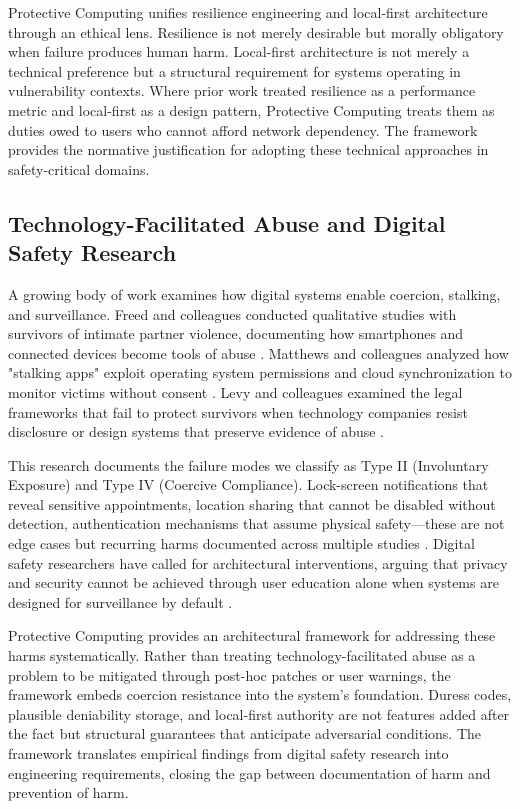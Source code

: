 \documentclass[acmsmall,review]{acmart}
\begin{document}
Protective Computing unifies resilience engineering and local-first architecture through an ethical lens. Resilience is not merely desirable but morally obligatory when failure produces human harm. Local-first architecture is not merely a technical preference but a structural requirement for systems operating in vulnerability contexts. Where prior work treated resilience as a performance metric and local-first as a design pattern, Protective Computing treats them as duties owed to users who cannot afford network dependency. The framework provides the normative justification for adopting these technical approaches in safety-critical domains.

\subsection{Technology-Facilitated Abuse and Digital Safety Research}

A growing body of work examines how digital systems enable coercion, stalking, and surveillance. Freed and colleagues conducted qualitative studies with survivors of intimate partner violence, documenting how smartphones and connected devices become tools of abuse \cite{Freed2018,Freed2019}. Matthews and colleagues analyzed how "stalking apps" exploit operating system permissions and cloud synchronization to monitor victims without consent \cite{Matthews2021}. Levy and colleagues examined the legal frameworks that fail to protect survivors when technology companies resist disclosure or design systems that preserve evidence of abuse \cite{Levy2020,Tsukayama2022}.

This research documents the failure modes we classify as Type II (Involuntary Exposure) and Type IV (Coercive Compliance). Lock-screen notifications that reveal sensitive appointments, location sharing that cannot be disabled without detection, authentication mechanisms that assume physical safety---these are not edge cases but recurring harms documented across multiple studies \cite{Chatfield2023,Dell2023}. Digital safety researchers have called for architectural interventions, arguing that privacy and security cannot be achieved through user education alone when systems are designed for surveillance by default \cite{Stark2020}.

Protective Computing provides an architectural framework for addressing these harms systematically. Rather than treating technology-facilitated abuse as a problem to be mitigated through post-hoc patches or user warnings, the framework embeds coercion resistance into the system's foundation. Duress codes, plausible deniability storage, and local-first authority are not features added after the fact but structural guarantees that anticipate adversarial conditions. The framework translates empirical findings from digital safety research into engineering requirements, closing the gap between documentation of harm and prevention of harm.
\end{document}
